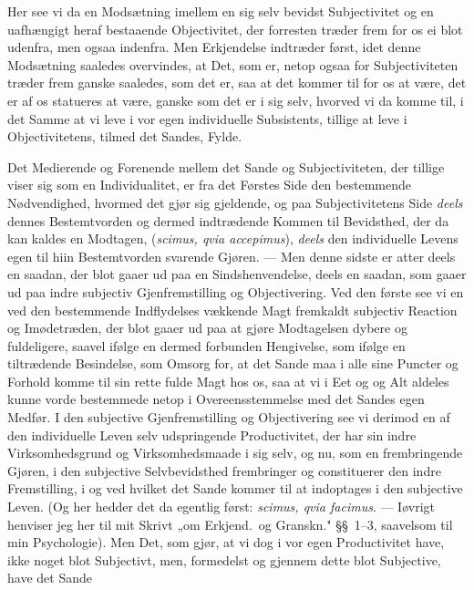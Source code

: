\documentclass[12pt,a4paper]{book}
\newcommand{\apage}[1]{\marginnote{\footnotesize\textit{[#1]}}}
\begin{document}
Her see vi da en Modsætning imellem en sig selv bevidst Subjectivitet og en
uafhængigt heraf bestaaende Objectivitet, der forresten træder frem for os ei
blot udenfra, men ogsaa indenfra. Men Erkjendelse indtræder først, idet denne
Modsætning saaledes overvindes, at Det, som er, netop ogsaa for Subjectiviteten
træder frem ganske saaledes, som det er, saa at det kommer til for os at være,
det er af os statueres at være, ganske som det er i sig selv, hvorved vi da
komme til, i det Samme at vi leve i vor egen individuelle Subsistents, tillige
at leve i Objectivitetens, tilmed det Sandes, Fylde.

Det Medierende og Forenende mellem det Sande og Subjectiviteten, der tillige
viser sig som en Individualitet, er fra det Førstes Side den bestemmende
Nødvendighed, hvormed det gjør sig gjeldende, og paa Subjectivitetens Side
\emph{deels} dennes Bestemtvorden og dermed indtrædende \apage{8}  Kommen til Bevidsthed,
der da kan kaldes en Modtagen, (\textit{scimus, qvia accepimus}), \emph{deels}
den individuelle Levens egen til hiin Bestemtvorden svarende Gjøren. --- Men
denne sidste er atter deels en saadan, der blot gaaer ud paa en
Sindshenvendelse, deels en saadan, som gaaer ud paa indre subjectiv
Gjenfremstilling og Objectivering. Ved den første see vi en ved den bestemmende
Indflydelses vækkende Magt fremkaldt subjectiv Reaction og Imødetræden, der blot
gaaer ud paa at gjøre Modtagelsen dybere og fuldeligere, saavel ifølge en dermed
forbunden Hengivelse, som ifølge en tiltrædende Besindelse, som Omsorg for, at
det Sande maa i alle sine Puncter og Forhold komme til sin rette fulde Magt hos
os, saa at vi i Eet og og Alt aldeles kunne vorde bestemmede netop i
Overeensstemmelse med det Sandes egen Medfør. I den subjective Gjenfremstilling
og Objectivering see vi derimod en af den individuelle Leven selv udspringende
Productivitet, der har sin indre Virksomhedsgrund og Virksomhedsmaade i sig
selv, og nu, som en frembringende Gjøren, i den subjective Selvbevidsthed
frembringer og constituerer den indre Fremstilling, i og ved hvilket det Sande
kommer til at indoptages i den subjective Leven. (Og her hedder det da egentlig
først: \textit{scimus, qvia facimus}. --- Iøvrigt henviser jeg her til mit
Skrivt „om Erkjend.\ og Granskn." \S\S~1--3, saavelsom til min Psychologie). Men
Det, som gjør, at vi dog i vor egen Productivitet have, ikke noget blot
Subjectivt, men, formedelst og gjennem dette blot Subjective, have det Sande
\end{document}

